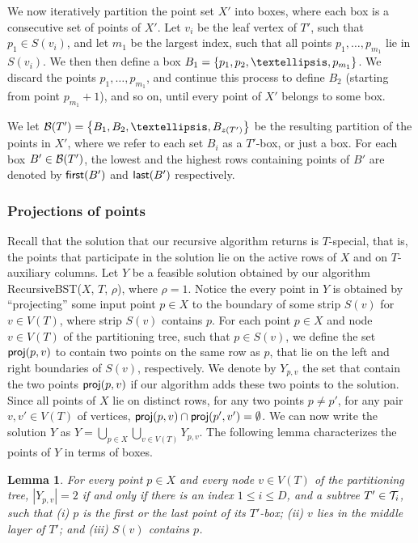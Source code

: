\documentclass[11pt]{article}
\numberwithin{equation}{section}
\newtheorem{lemma}[theorem]{Lemma}
\theoremstyle{definition}
\theoremstyle{plain}
\begin{document}
We now iteratively partition the point set $X'$ into boxes, where each box is a consecutive set of points of $X'$. 
Let $v_i$ be the leaf vertex of $T'$, such that $p_1\in S(v_i)$, and let $m_1$ be the largest index, such that all points $p_1,\ldots,p_{m_1}$ lie in $S(v_i)$. We then then define a box $B_1 = \set{p_1, p_2,\ldots, p_{m_1}}$. We discard the points $p_1,\ldots,p_{m_1}$, and continue this process to define $B_2$ (starting from point $p_{m_1}+1$), and so on, until every point of $X'$ belongs to some box.

%
%

We let $\bset(T') = \set{B_1,B_2,\ldots, B_{z(T')}}$ be the resulting partition of the points in $X'$, where we refer to each set $B_i$ as a $T'$-box, or just a box.
For each box $B' \in {\mathcal{B}}(T')$, the lowest and the highest rows containing points of $B'$ are denoted by ${\sf first}(B')$ and ${\sf last}(B')$ respectively.
 


\subsubsection{Projections of points} 

Recall that the solution that our recursive algorithm returns is $T$-special, that is, the points that participate in the solution lie on the active rows of $X$ and on $T$-auxiliary columns. 
Let $Y$ be a feasible solution obtained by our algorithm {\sc RecursiveBST}($X$, $T$, $\rho$), where $\rho=1$. 
Notice the every point in $Y$ is obtained by ``projecting'' some input point $p \in X$ to the boundary of some strip $S(v)$ for $v \in V(T)$, where strip $S(v)$ contains $p$.  
For each point $p \in X$ and node $v \in V(T)$ of the partitioning tree, such that $p \in S(v)$, we define the set ${\sf proj}(p,v)$ to contain two points on the same row as $p$, that lie on the left and right boundaries of $S(v)$, respectively.
We denote by $Y_{p,v}$ the set that contain the two points ${\sf proj}(p,v)$ if  our algorithm adds these two points to the solution. Since all points of $X$ lie on distinct rows, for any two points $p\neq p'$, for any pair $v,v'\in V(T)$ of vertices, ${\sf proj}(p,v)\cap {\sf proj}(p',v')=\emptyset$.
We can now write the solution $Y$ as $Y = \bigcup_{p \in X} \bigcup_{v \in V(T)} Y_{p,v}$.   
%
%
%
The following lemma characterizes the points of $Y$ in terms of boxes.  

\begin{lemma} 
For every point $p \in X$ and every node $v \in V(T)$ of the partitioning tree, $|Y_{p,v}| =2$ if and only if there is an index $1\leq i\leq D$, and a subtree $T' \in {\mathcal T}_i$, such that (i) $p$ is the first or the last point of its $T'$-box; (ii) $v$ lies in the middle layer of $T'$; and (iii) $S(v)$ contains $p$.
\end{lemma} 
\end{document}
